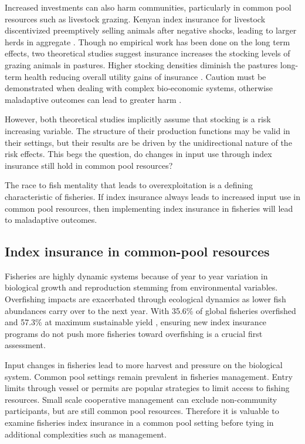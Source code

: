 \documentclass[
  super,
  preprint,
  3p]{elsarticle}
\theoremstyle{plain}
\theoremstyle{plain}
\theoremstyle{remark}
\begin{document}
Increased investments can also harm communities, particularly in common
pool resources such as livestock grazing. Kenyan index insurance for
livestock discentivized preemptively selling animals after negative
shocks, leading to larger herds in aggregate \citep{Janzen2018}. Though
no empirical work has been done on the long term effects, two
theoretical studies suggest insurance increases the stocking levels of
grazing animals in pastures. Higher stocking densities diminish the
pastures long-term health reducing overall utility gains of insurance
\citep{muller2011, Bulte2021}. Caution must be demonstrated when dealing
with complex bio-economic systems, otherwise maladaptive outcomes can
lead to greater harm \citep{muller2017}.

However, both theoretical studies implicitly assume that stocking is a
risk increasing variable. The structure of their production functions
may be valid in their settings, but their results are be driven by the
unidirectional nature of the risk effects. This begs the question, do
changes in input use through index insurance still hold in common pool
resources?

The race to fish mentality that leads to overexploitation is a defining
characteristic of fisheries. If index insurance always leads to
increased input use in common pool resources, then implementing index
insurance in fisheries will lead to maladaptive outcomes.

\hypertarget{sec-common}{%
\subsection{Index insurance in common-pool resources}\label{sec-common}}

Fisheries are highly dynamic systems because of year to year variation
in biological growth and reproduction stemming from environmental
variables. Overfishing impacts are exacerbated through ecological
dynamics as lower fish abundances carry over to the next year. With
35.6\% of global fisheries overfished and 57.3\% at maximum sustainable
yield \citep{fao2022}, ensuring new index insurance programs do not push
more fisheries toward overfishing is a crucial first assessment.

Input changes in fisheries lead to more harvest and pressure on the
biological system. Common pool settings remain prevalent in fisheries
management. Entry limits through vessel or permits are popular
strategies to limit access to fishing resources. Small scale cooperative
management can exclude non-community participants, but are still common
pool resources. Therefore it is valuable to examine fisheries index
insurance in a common pool setting before tying in additional
complexities such as management.
\end{document}
